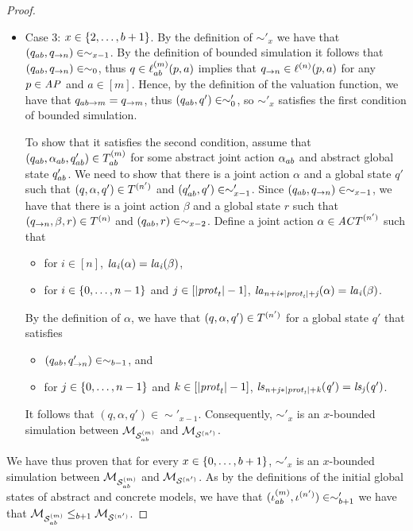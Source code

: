 \begin{proof}
\begin{itemize}
  \item Case 3: $x \in \left \{ 2, \ldots, b+1 \right \}$.   By the definition of $\sim'_x$
  we have that $(q_{ab}, q_{\rightarrow n}) \in \sim_{x-1}$. By the definition
  of bounded simulation it follows that $(q_{ab}, q_{\rightarrow n}) \in
  \sim_0$, thus  $q \in \ell^{(m)}_{ab}(p, a)$ implies that $q_{\rightarrow n} \in
  \ell^{(n)} (p, a)$ for any $p \in \it{AP}$ and $a \in [m]$. Hence, by the
  definition of the valuation function, we have that $q_{ab \rightarrow m} =
  q_{\rightarrow m}$, thus $(q_{ab}, q') \in \sim'_0$, so $\sim'_{x}$
  satisfies the first condition of bounded simulation. 


  To show that it satisfies the second condition, assume that $(q_{ab},
  \alpha_{ab}, q_{ab}') \in T^{(m)}_{ab}$ for some abstract joint action
  $\alpha_{ab}$ and abstract global state $q_{ab}'$. We need to show that there
  is a joint action $\alpha$ and a  global state $q'$ such that $(q, \alpha, q')
  \in T^{(n')}$ and $(q_{ab}', q') \in \sim'_{x-1}$. Since $(q_{ab},
  q_{\rightarrow n}) \in \sim_{x-1}$, we have that there is a joint action
  $\beta$ and a global state $r$ such that $(q_{\rightarrow n}, \beta, r) \in
  T^{(n)}$ and $(q_{ab}, r) \in \sim_{x-2}$. Define a joint action
  $\alpha \in \mathit{ACT}^{(n')}$ such that
  
  \begin{itemize}
    \item for $i \in [n]$, $\it{la}_{i}({\alpha}) = \it{la}_{i}({\beta})$, 
    \item  for $i \in \left \{ 0, \ldots, n-1 \right \}$ and $j \in [|\mathit{prot}_{t}| -  1]$, $\it{la}_{n +
    i * |\mathit{prot}_{t}| + j}({\alpha}) = \it{la}_{i}({\beta})$.
  \end{itemize}

  By the definition of $\alpha$, we have that $(q, \alpha, q')  \in
  T^{(n')}$ for a global state $q'$ that satisfies

  \begin{itemize}
    \item  $(q_{ab},q'_{\rightarrow n}) \in \sim_{b-1}$, and 
    \item  for $j \in \left \{ 0, \ldots, n-1 \right \}$ and $k \in [|\mathit{prot}_{t}| -  1]$, 
    $\it{ls}_{n + j * |\mathit{prot}_{t}| + k}(q') = \it{ls}_{j}(q')$.
  \end{itemize}

  It follows that $(q, \alpha, q') \in \sim'_{x-1}$. Consequently, $\sim'_{x}$
  is an $x$-bounded simulation between $\mathcal{M}_{\mathcal{S}_{ab}^{(m)}}$ and $\mathcal{M}_{\mathcal{S}^{(n')}}$.

\end{itemize}

We have thus proven that for every $x \in \left \{ 0, \ldots, b+1 \right \}$, $\sim'_x$ is an
$x$-bounded simulation between $\mathcal{M}_{\mathcal{S}_{ab}^{(m)}}$ and $\mathcal{M}_{\mathcal{S}^{(n')}}$.  As by the
definitions of the initial global states of abstract and concrete models, we
have that $(\iota^{({m})}_{ab}, \iota^{({n'})}) \in \sim'_{b+1}$ we have that
$\mathcal{M}_{\mathcal{S}_{ab}^{(m)}} \leq_{b+1} \mathcal{M}_{\mathcal{S}^{(n')}}$.

\end{proof}



